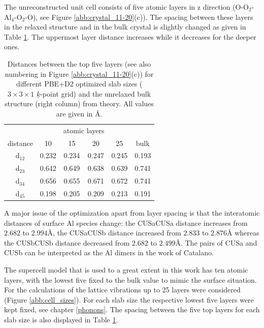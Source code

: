 \documentclass[11pt,DIV=13,BCOR=5mm,a4paper,headinclude]{scrbook}
\renewcommand{\vec}[1]{\underline{#1}}
\begin{document}
The unreconstructed unit cell consists of five atomic layers in z direction (O-O$_2$-Al$_4$-O$_2$-O), see Figure \ref{abb:crystal_11-20}(c)).
The spacing between these layers in the relaxed structure and in the bulk crystal is slightly changed as given in Table \ref{tab:layer-dist}.
The uppermost layer distance increases while it decreases for the deeper ones.
\begin{table}[!ht]
  \centering
 \caption{Distances between the top five layers (see also numbering in Figure \ref{abb:crystal_11-20}(c)) for different PBE+D2 optimized slab sizes ($3\times 3\times 1$ $\vec{k}$-point grid) and the unrelaxed bulk structure (right column) from theory.
All values are given in \AA.} 
\vspace*{.2cm}
\begin{tabular}{c|cccc|c}
\toprule
 & &\multicolumn{2}{c}{atomic layers}&&\\
    distance    & 10   & 15   & 20   & 25   &bulk \\\midrule
 d$_{12}$	&0.232 &0.234 &0.247 &0.245 &0.193 \\
 d$_{23}$	&0.642 &0.649 &0.638 &0.639 &0.741 \\
 d$_{34}$	&0.656 &0.655 &0.671 &0.672 &0.741 \\
 d$_{45}$	&0.198 &0.205 &0.209 &0.213 &0.191 \\\bottomrule
  \end{tabular}
  \label{tab:layer-dist}
\end{table}
A major issue of the optimization apart from layer spacing is that the interatomic distances of surface Al species change: the CUSa\textendash CUSa distance increases from $2.682$ to $2.994$\AA{}, the CUSa\textendash CUSb distance increased from $2.833$ to $2.876$\AA{} whereas the CUSb\textendash CUSb distance decreased from $2.682$ to $2.499$\AA{}.
The pairs of CUSa and CUSb can be interpreted as the Al dimers in the work of Catalano\cite{catalano}.


The supercell model that is used to a great extent in this work has ten atomic layers, with the lowest five fixed to the bulk value to mimic the surface situation.
For the calculations of the lattice vibrations up to 25 layers were considered (Figure \ref{abb:cell_sizes}).
For each slab size the respective lowest five layers were kept fixed, see chapter \ref{phonons}.
The spacing between the five top layers for each slab size is also displayed in Table \ref{tab:layer-dist}.
\end{document}
